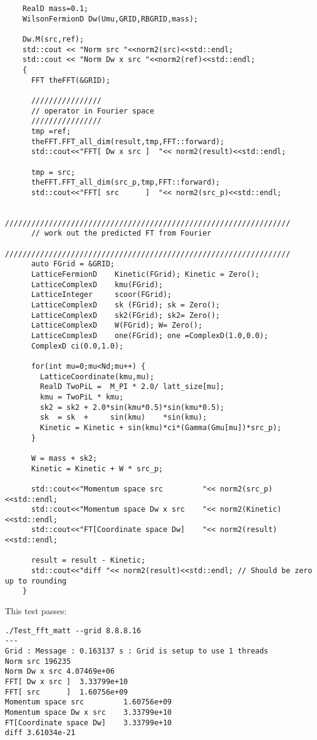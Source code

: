 \documentclass[letter,10pt]{report}
\begin{document}
\begin{verbatim}
    RealD mass=0.1;
    WilsonFermionD Dw(Umu,GRID,RBGRID,mass);
    
    Dw.M(src,ref);
    std::cout << "Norm src "<<norm2(src)<<std::endl;
    std::cout << "Norm Dw x src "<<norm2(ref)<<std::endl;
    {
      FFT theFFT(&GRID);

      ////////////////
      // operator in Fourier space
      ////////////////
      tmp =ref;
      theFFT.FFT_all_dim(result,tmp,FFT::forward);
      std::cout<<"FFT[ Dw x src ]  "<< norm2(result)<<std::endl;    

      tmp = src;
      theFFT.FFT_all_dim(src_p,tmp,FFT::forward);
      std::cout<<"FFT[ src      ]  "<< norm2(src_p)<<std::endl;
      
      /////////////////////////////////////////////////////////////////
      // work out the predicted FT from Fourier
      /////////////////////////////////////////////////////////////////
      auto FGrid = &GRID;
      LatticeFermionD    Kinetic(FGrid); Kinetic = Zero();
      LatticeComplexD    kmu(FGrid); 
      LatticeInteger     scoor(FGrid); 
      LatticeComplexD    sk (FGrid); sk = Zero();
      LatticeComplexD    sk2(FGrid); sk2= Zero();
      LatticeComplexD    W(FGrid); W= Zero();
      LatticeComplexD    one(FGrid); one =ComplexD(1.0,0.0);
      ComplexD ci(0.0,1.0);
    
      for(int mu=0;mu<Nd;mu++) {
        LatticeCoordinate(kmu,mu);
        RealD TwoPiL =  M_PI * 2.0/ latt_size[mu];
        kmu = TwoPiL * kmu;
        sk2 = sk2 + 2.0*sin(kmu*0.5)*sin(kmu*0.5);
        sk  = sk  +     sin(kmu)    *sin(kmu); 
        Kinetic = Kinetic + sin(kmu)*ci*(Gamma(Gmu[mu])*src_p);
      }
    
      W = mass + sk2; 
      Kinetic = Kinetic + W * src_p;
    
      std::cout<<"Momentum space src         "<< norm2(src_p)<<std::endl;
      std::cout<<"Momentum space Dw x src    "<< norm2(Kinetic)<<std::endl;
      std::cout<<"FT[Coordinate space Dw]    "<< norm2(result)<<std::endl;
    
      result = result - Kinetic;
      std::cout<<"diff "<< norm2(result)<<std::endl; // Should be zero up to rounding
    }
\end{verbatim}

This test passes:
\begin{verbatim}
./Test_fft_matt --grid 8.8.8.16
---
Grid : Message : 0.163137 s : Grid is setup to use 1 threads
Norm src 196235
Norm Dw x src 4.07469e+06
FFT[ Dw x src ]  3.33799e+10
FFT[ src      ]  1.60756e+09
Momentum space src         1.60756e+09
Momentum space Dw x src    3.33799e+10
FT[Coordinate space Dw]    3.33799e+10
diff 3.61034e-21
\end{verbatim}
\end{document}
